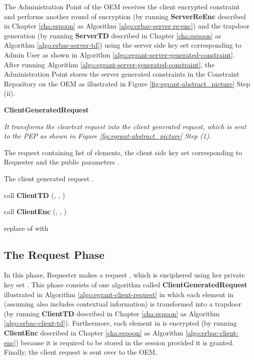 \documentclass[epsfig,a4paper,11pt,titlepage]{book}
\numberwithin{algorithm}{chapter}
\newcommand{\algofontsize}{\fontsize{11}{12}\selectfont}
\begin{document}
The Administration Point of the \gls{OEM} receives the client encrypted constraint  and performs another round of encryption (by running \textbf{ServerReEnc} described in Chapter \ref{cha:espoon} as Algorithm \ref{algo:erbac-server-re-enc}) and the trapdoor generation (by running \textbf{ServerTD} described in Chapter \ref{cha:espoon} as Algorithm \ref{algo:erbac-server-td}) using the server side key set  corresponding to Admin User  as shown in Algorithm \ref{algo:egrant-server-generated-constraint}. After running Algorithm \ref{algo:egrant-server-generated-constraint}, the Administration Point stores the server generated constraints in the Constraint Repository on the \gls{OEM} as illustrated in Figure \ref{fig:egrant-abstract_picture} Step (ii).



\begin{algorithm} [htp]
{\algofontsize
\caption{\textbf{ClientGeneratedRequest}}

\label{algo:egrant-client-request}

\begin{algorithmic}[1]

\INPUT \emph{It transforms the cleartext request into the client generated request, which is sent to the \gls{PEP} as shown in Figure \ref{fig:egrant-abstract_picture} Step (1).}

\Require The request  containing list of elements, the client side key set  corresponding to Requester  and the public parameters .

\Ensure The client generated request .

\medskip

\State 


	\State  call \textbf{ClientTD} (, , )
	
	\State  call \textbf{ClientEnc} (, , )
	
	\State 
	
	\State replace  of  with 

\EndFor

\Return 

\end{algorithmic}
}
\end{algorithm}

\subsection{The Request Phase}
In this phase, Requester  makes a request , which is enciphered using her private key set . This phase consists of one algorithm called \textbf{ClientGeneratedRequest} illustrated in Algorithm \ref{algo:egrant-client-request} in which each element in  (assuming  also includes contextual information) is transformed into a trapdoor (by running \textbf{ClientTD} described in Chapter \ref{cha:espoon} as Algorithm \ref{algo:erbac-client-td}). Furthermore, each element in  is encrypted (by running \textbf{ClientEnc} described in Chapter \ref{cha:espoon} as Algorithm \ref{algo:erbac-client-enc}) because it is required to be stored in the session provided it is granted. Finally, the client request  is sent over to the \gls{OEM}.
\end{document}
